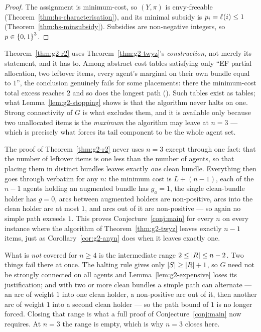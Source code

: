 \begin{proof}
The assignment is minimum-cost, so $(Y,\pi)$ is envy-freeable
(Theorem~\ref{thm:hs-characterisation}), and its minimal subsidy is
$p_i = \ell_{}(i) \le 1$ (Theorem~\ref{thm:hs-minsubsidy}). Subsidies are
non-negative integers, so $p \in \left\{0,1\right\}^3$.
\end{proof}

\begin{remark}
\label{rem:g2-blackbox}
Theorem~\ref{thm:g2-r2} uses Theorem~\ref{thm:g2-twyz}'s \emph{construction}, not merely
its statement, and it has to. Among abstract cost tables satisfying only
``EF partial allocation, two leftover items, every agent's marginal on their
own bundle equal to $1$'', the conclusion genuinely fails for some
placements: there the minimum-cost total excess reaches $2$ and so does the
longest path (). Such tables exist as tables; what
Lemma~\ref{lem:g2-stopping} shows is that the algorithm never halts on one.
Strong connectivity of $G$ is what excludes them, and it is available only
because two unallocated items is the \emph{maximum} the algorithm may leave
at $n = 3$ --- which is precisely what forces its tail component to be the
whole agent set.
\end{remark}

\begin{remark}[How far this reaches beyond $n = 3$]
\label{rem:g2-beyond}
The proof of Theorem~\ref{thm:g2-r2} never uses $n = 3$ except through one fact:
that the number of leftover items is one less than the number of agents, so
that placing them in distinct bundles leaves exactly \emph{one} clean bundle.
Everything then goes through verbatim for any $n$: the minimum cost is
$L + (n-1)$, each of the $n-1$ agents holding an augmented bundle has
$g_a = 1$, the single clean-bundle holder has $g = 0$, arcs between
augmented holders are non-positive, arcs into the clean holder are at most
$1$, and arcs out of it are non-positive --- so again no simple path exceeds
$1$. This proves Conjecture~\ref{conj:main} for every $n$ on every instance
where the algorithm of Theorem~\ref{thm:g2-twyz} leaves exactly $n-1$ items, just
as Corollary~\ref{cor:g2-anyn} does when it leaves exactly one.

What is \emph{not} covered for $n \ge 4$ is the intermediate range
$2 \le \left\lvert R\right\rvert \le n-2$. Two things fail there at once. The halting rule gives
only $\left\lvert S\right\rvert \ge \left\lvert R\right\rvert + 1$, so $G$ need not be strongly connected on all
agents and Lemma~\ref{lem:g2-expensive} loses its justification; and with two or
more clean bundles a simple path can alternate --- an arc of weight $1$ into
one clean holder, a non-positive arc out of it, then another arc of weight
$1$ into a second clean holder --- so the path bound of $1$ is no longer
forced. Closing that range is what a full proof of
Conjecture~\ref{conj:main} now requires. At $n = 3$ the range is empty,
which is why $n = 3$ closes here.
\end{remark}

